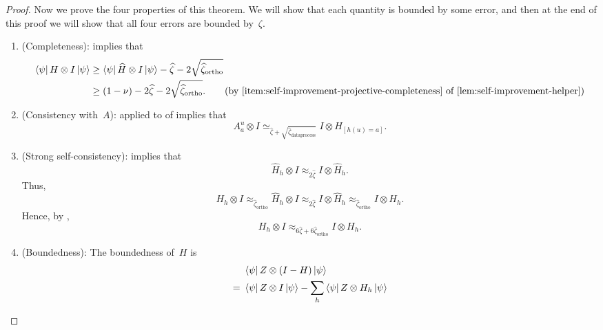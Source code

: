 \begin{proof}
Now we prove the four properties of this theorem.
We will show that each quantity is bounded by some error,
and then at the end of this proof we will show that all four errors are bounded by~$\zeta$.
\begin{enumerate}
    \item(Completeness):
 implies that
\begin{align*}
 \bra{\psi} H \otimes I \ket{\psi}
 & \geq  \bra{\psi} \widehat{H} \otimes I \ket{\psi} - \widehat{\zeta} - 2\sqrt{\widehat{\zeta}_{\mathrm{ortho}}}\\
 & \geq  (1-\nu) -  2\widehat{\zeta} - 2\sqrt{\widehat{\zeta}_{\mathrm{ortho}}}. \tag{by \Cref{item:self-improvement-projective-completeness} of \Cref{lem:self-improvement-helper}}
\end{align*}
	\item (Consistency with~$A$):
 applied to
  of 
implies that
\begin{equation*}
A^u_a \otimes I \simeq_{\widehat{\zeta} + \sqrt{\widehat{\zeta}_{\mathrm{dataprocess}}}}
		I \otimes H_{[h(u) = a]}.
\end{equation*}
	\item (Strong self-consistency):  implies that
		\begin{equation*}
		\widehat{H}_h \otimes I \approx_{2\widehat{\zeta}} I \otimes \widehat{H}_h.
		\end{equation*}
		Thus,
		\begin{equation*}
			H_h \otimes I
			\approx_{\widehat{\zeta}_{\mathrm{ortho}}} \widehat{H}_{h} \otimes I
			\approx_{2\widehat{\zeta}} I \otimes \widehat{H}_{h}
			\approx_{\widehat{\zeta}_{\mathrm{ortho}}} I \otimes H_h.
		\end{equation*}
		Hence, by ,
		\begin{equation*}
		H_h \otimes I \approx_{6 \widehat{\zeta} + 6\widehat{\zeta}_{\mathrm{ortho}}} I \otimes H_h.
		\end{equation*}
	\item (Boundedness):
		The boundedness of~$H$ is
		\begin{align}
		&\bra{\psi} Z \otimes (I - H) \ket{\psi}\nonumber\\
		=~& \bra{\psi} Z \otimes I \ket{\psi} - \sum_h \bra{\psi} Z \otimes H_h \ket{\psi}\nonumber\\

\end{align}
\end{enumerate}
\end{proof}
